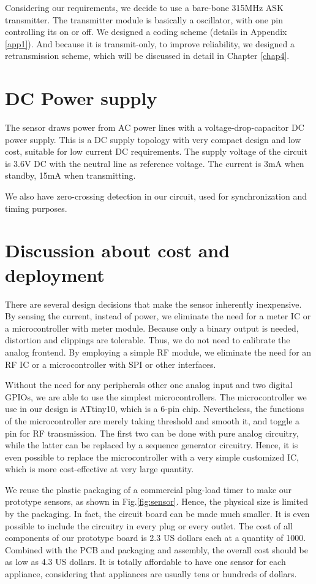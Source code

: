 Considering our requirements, we decide to use a bare-bone 315MHz ASK transmitter. The transmitter module is basically a oscillator, with one pin controlling its on or off. We designed a coding scheme (details in Appendix \ref{app1}). And because it is transmit-only, to improve reliability, we designed a retransmission scheme, which will be discussed in detail in Chapter \ref{chap4}. 

\section{DC Power supply}

The sensor draws power from AC power lines with a voltage-drop-capacitor DC power supply. This is a DC supply topology with very compact design and low cost, suitable for low current DC requirements. The supply voltage of the circuit is 3.6V DC with the neutral line as reference voltage. The current is 3mA when standby, 15mA when transmitting. 

We also have zero-crossing detection in our circuit, used for synchronization and timing purposes. 

\section{Discussion about cost and deployment}

There are several design decisions that make the sensor inherently inexpensive. By sensing the current, instead of power, we eliminate the need for a meter IC or a microcontroller with meter module. Because only a binary output is needed, distortion and clippings are tolerable. Thus, we do not need to calibrate the analog frontend. By employing a simple RF module, we eliminate the need for an RF IC or a microcontroller with SPI or other interfaces. 

Without the need for any peripherals other one analog input and two digital GPIOs, we are able to use the simplest microcontrollers. The microcontroller we use in our design is ATtiny10, which is a 6-pin chip. Nevertheless, the functions of the microcontroller are merely taking threshold and smooth it, and toggle a pin for RF transmission. The first two can be done with pure analog circuitry, while the latter can be replaced by a sequence generator circuitry. Hence, it is even possible to replace the microcontroller with a very simple customized IC, which is more cost-effective at very large quantity. 

We reuse the plastic packaging of a commercial plug-load timer to make our prototype sensors, as shown in Fig.\ref{fig:sensor}. Hence, the physical size is limited by the packaging. In fact, the circuit board can be made much smaller. It is even possible to include the circuitry in every plug or every outlet. The cost of all components of our prototype board is 2.3 US dollars each at a quantity of 1000. Combined with the PCB and packaging and assembly, the overall cost should be as low as 4.3 US dollars. It is totally affordable to have one sensor for each appliance, considering that appliances are usually tens or hundreds of dollars. 

